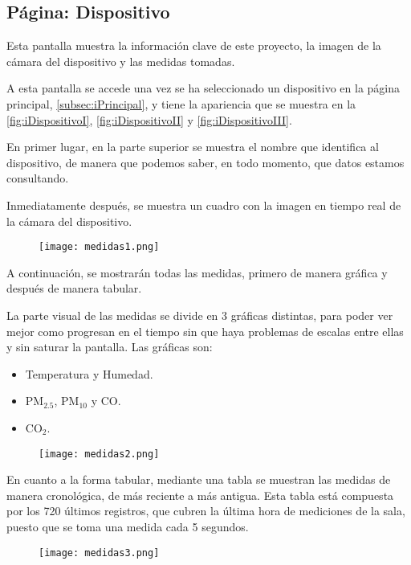 \subsection{Página: Dispositivo}\label{subsec:iDispositivo}
Esta pantalla muestra la información clave de este proyecto, la imagen de la cámara del dispositivo y las medidas tomadas. 

A esta pantalla se accede una vez se ha seleccionado un dispositivo en la página principal, \autoref{subsec:iPrincipal}, y tiene la apariencia que se muestra en la \autoref{fig:iDispositivoI}, \autoref{fig:iDispositivoII} y \autoref{fig:iDispositivoIII}.

En primer lugar, en la parte superior se muestra el nombre que identifica al dispositivo, de manera que podemos saber, en todo momento, que datos estamos consultando.

Inmediatamente después, se muestra un cuadro con la imagen en tiempo real de la cámara del dispositivo.
\begin{figure}[H]
	{\texttt{[image: medidas1.png]}}
\end{figure}
A continuación, se mostrarán todas las medidas, primero de manera gráfica y después de manera tabular.

La parte visual de las medidas se divide en 3 gráficas distintas, para poder ver mejor como progresan en el tiempo sin que haya problemas de escalas entre ellas y sin saturar la pantalla. Las gráficas son:
\begin{itemize}
	\item Temperatura y Humedad.
	\item PM$_{2.5}$, PM$_{10}$ y CO\@.
	\item CO$_2$.
\end{itemize}
\begin{figure}[H]
	{\texttt{[image: medidas2.png]}}
\end{figure}
En cuanto a la forma tabular, mediante una tabla se muestran las medidas de manera cronológica, de más reciente a más antigua. Esta tabla está compuesta por los 720 últimos registros, que cubren la última hora de mediciones de la sala, puesto que se toma una medida cada 5 segundos.
\vspace{.5cm}
\begin{figure}[H]
	{\texttt{[image: medidas3.png]}}
\end{figure}

